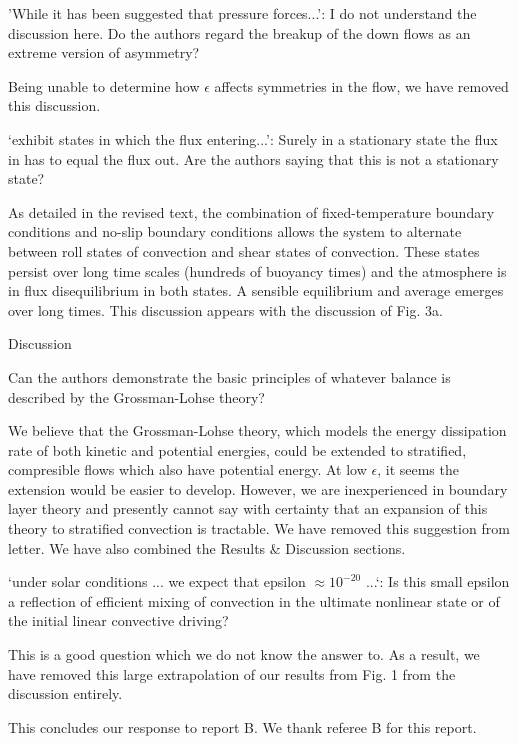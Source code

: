 \documentclass[aps, 11pt, singlecolumn]{revtex4-1} %
\begin{document}
\begin{singlespace}
\begin{myquotation}
'While it has been suggested that pressure forces...': I do not
understand the discussion here. Do the authors regard the breakup of
the down flows as an extreme version of asymmetry?
\end{myquotation}
Being unable to determine how $\epsilon$ affects symmetries in the
flow, we have removed this discussion.

\begin{myquotation}
`exhibit states in which the flux entering...': Surely in a
stationary state the flux in has to equal the flux out. Are the
authors saying that this is not a stationary state?
\end{myquotation}
As detailed in the revised text, the combination of fixed-temperature
boundary conditions and no-slip boundary conditions allows the system to alternate between
roll states of convection and shear states of convection.  These states persist over long
time scales (hundreds of buoyancy times) and the atmosphere is in flux disequilibrium in both states.
A sensible equilibrium and average emerges over long times.  This discussion appears with
the discussion of Fig. 3a.

\begin{myquotation}
Discussion

Can the authors demonstrate the basic principles of whatever balance
is described by the Grossman-Lohse theory?
\end{myquotation}
We believe that the Grossman-Lohse theory, which models the energy dissipation rate of both
kinetic and potential energies, could be extended to stratified, compresible flows which also
have potential energy.  At low $\epsilon$, it seems the extension would be easier to
develop. However, we are inexperienced in boundary layer theory and presently 
cannot say with certainty that an expansion of this theory to stratified convection is tractable. 
We have removed this suggestion from letter.  We have also combined the Results \& Discussion
sections.


\begin{myquotation}
`under solar conditions ... we expect that epsilon  $\approx 10^{-20}$
...`: Is this small epsilon a reflection of efficient mixing of
convection in the ultimate nonlinear state or of the initial linear
convective driving?
\end{myquotation}
This is a good question which we do not know the answer to.  As a result, we have
removed this large extrapolation of our results from Fig. 1 from the discussion
entirely.

This concludes our response to report B.  We thank referee B for this report.

$\,$
\newline
\noindent


\end{singlespace}





\end{document}
